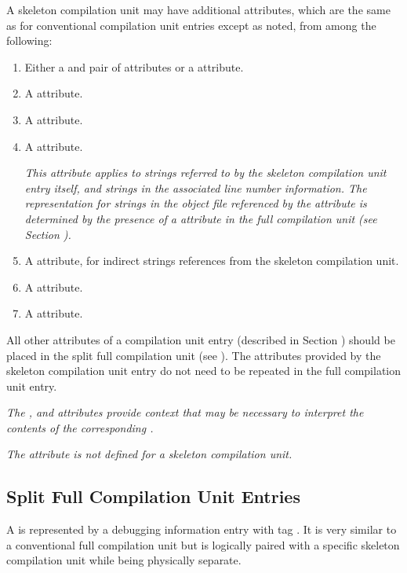 A skeleton compilation unit may have additional attributes, 
which are the same as for conventional compilation unit entries 
except as noted, from among the following:
\begin{enumerate}[1. ]
\addtocounter{enumi}{1}
\item Either a \DWATlowpc{} and \DWAThighpc{} pair of attributes
or a \DWATranges{} attribute.
\item A \DWATstmtlist{} attribute.
\item A \DWATcompdir{} attribute.

\item A \DWATuseUTFeight{} attribute.

\textit{This attribute applies to strings referred to by the skeleton
compilation unit entry itself, and strings in the associated line
number information.
The representation for strings in the object file referenced 
by the \DWATdwoname{} attribute is determined by the presence 
of a \DWATuseUTFeight{} attribute in the full compilation unit 
(see Section ).}

\item A \DWATstroffsetsbase{} attribute, for indirect strings references 
from the skeleton compilation unit.
\item A \DWATaddrbase{} attribute.
\item A \DWATrangesbase{} attribute.

\end{enumerate}

All other attributes of a compilation unit entry (described
in Section ) 
should be placed in the split full compilation unit
(see ).
The attributes provided by the skeleton compilation
unit entry do not need to be repeated in the full compilation
unit entry.

\textit{The \DWATaddrbase{}, \DWATrangesbase{} and 
\DWATstroffsetsbase{} attributes provide context that may be 
necessary to interpret the contents
of the corresponding \splitDWARFobjectfile.}

\textit{The \DWATbasetypes{} attribute is not defined for a
skeleton compilation unit.}


\subsection{Split Full Compilation Unit Entries}
\label{chap:splitfullcompilationunitentries}
A  is represented by a 
debugging information entry with tag \DWTAGcompileunit.
It is very similar to a conventional full compilation unit but
is logically paired with a specific skeleton compilation unit while
being physically separate.

